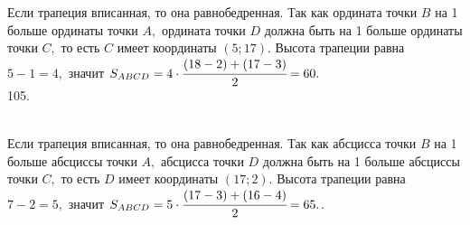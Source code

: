 \documentclass[12pt]{article}
\begin{document}
Если трапеция вписанная, то она равнобедренная. Так как ордината точки $B$ на 1 больше ординаты точки $A,$ ордината точки $D$ должна быть на 1 больше ординаты точки $C,$ то есть $C$ имеет координаты $(5;17).$ Высота трапеции равна $5-1=4,$ значит $S_{ABCD}=4\cdot\cfrac{(18-2)+(17-3)}{2}=60.$\\
105. \begin{figure}[ht!]
\end{figure}\\
Если трапеция вписанная, то она равнобедренная. Так как абсцисса точки $B$ на 1 больше абсциссы точки $A,$ абсцисса точки $D$ должна быть на 1 больше абсциссы точки $C,$ то есть $D$ имеет координаты $(17;2).$ Высота трапеции равна $7-2=5,$ значит $S_{ABCD}=5\cdot\cfrac{(17-3)+(16-4)}{2}=65.$\newpage{}. \begin{figure}[ht!]
\end{figure}\\
\end{document}
